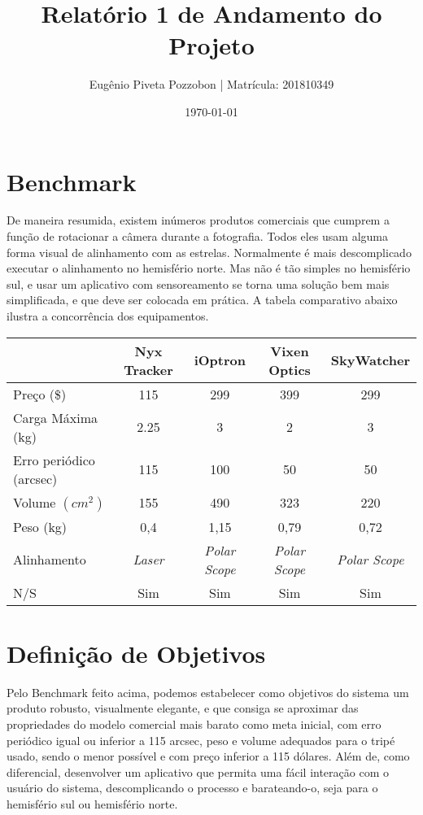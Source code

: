 \documentclass[a4paper, 12pt]{article}
\title{Relatório 1 de Andamento do Projeto}
\author{Eugênio Piveta Pozzobon | Matrícula: 201810349}
\date{\today}
\begin{document}
\maketitle
\newpage
\tableofcontents
\newpage
\section{Benchmark}

De maneira resumida, existem inúmeros produtos comerciais que cumprem a função de rotacionar a câmera durante a fotografia. Todos eles usam alguma forma visual de alinhamento com as estrelas. Normalmente é mais descomplicado executar o alinhamento no hemisfério norte. Mas não é tão simples no hemisfério sul, e usar um aplicativo com sensoreamento se torna uma solução bem mais simplificada, e que deve ser colocada em prática. A tabela comparativo abaixo ilustra a concorrência dos equipamentos. 

\begin{table}[htb]
	\begin{tabular}{l|cccc}
	 & Nyx Tracker & iOptron & Vixen Optics & SkyWatcher \\ \hline
	Preço (\$) & 115 & 299 & 399 & 299 \\\hline
	Carga Máxima (kg) & 2.25 & 3 & 2 & 3 \\\hline
	Erro periódico (arcsec) & 115 & 100 & 50 & 50 \\\hline
	Volume $ (cm^2) $ & 155 & 490 & 323 & 220 \\\hline
	Peso (kg) & 0,4 & 1,15 & 0,79 & 0,72 \\\hline
	Alinhamento & \textit{Laser} & \textit{Polar Scope} & \textit{Polar Scope} & \textit{Polar Scope} \\\hline
	N/S & Sim & Sim & Sim & Sim \\
\end{tabular}
\end{table}

\section{Definição de Objetivos}
Pelo Benchmark feito acima, podemos estabelecer como objetivos do sistema um produto robusto, visualmente elegante, e que consiga se aproximar das propriedades do modelo comercial mais barato como meta inicial, com erro periódico igual ou inferior a 115 arcsec, peso e volume adequados para o tripé usado, sendo o menor possível e com preço inferior a 115 dólares. Além de, como diferencial, desenvolver um aplicativo que permita uma fácil interação com o usuário do sistema, descomplicando o processo e barateando-o, seja para o hemisfério sul ou hemisfério norte.
\end{document}
